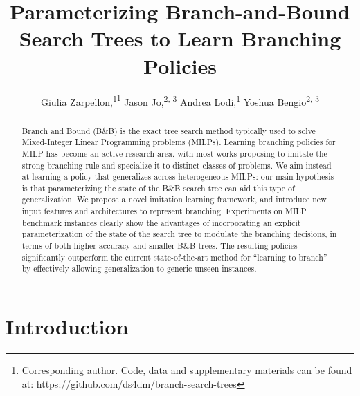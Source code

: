 \documentclass[letterpaper]{article} %
\title{Parameterizing Branch-and-Bound Search Trees to Learn Branching Policies}
\author{
   Giulia Zarpellon,\textsuperscript{\rm 1}\thanks{Corresponding author. Code, data and supplementary materials can be found at: https://github.com/ds4dm/branch-search-trees}
   Jason Jo,\textsuperscript{\rm 2, 3}
   Andrea Lodi,\textsuperscript{\rm 1}
   Yoshua Bengio\textsuperscript{\rm 2, 3}\\
}
\begin{document}
\maketitle
\begin{abstract}
  Branch and Bound (B\&B) is the exact tree search method typically used to solve Mixed-Integer Linear Programming problems (MILPs). Learning branching policies for MILP has become an active research area, with most works proposing to imitate the strong branching rule and specialize it to distinct classes of problems. We aim instead at learning a policy that generalizes across heterogeneous MILPs: our main hypothesis is that parameterizing the state of the B\&B search tree can aid this type of generalization. We propose a novel imitation learning framework, and introduce new input features and architectures to represent branching. Experiments on MILP benchmark instances clearly show the advantages of incorporating an explicit parameterization of the state of the search tree to modulate the branching decisions, in terms of both higher accuracy and smaller B\&B trees. The resulting policies significantly outperform the current state-of-the-art method for ``learning to branch'' by effectively allowing generalization to generic unseen instances.
\end{abstract}

\section{Introduction}
\label{sec:intro}
\end{document}
